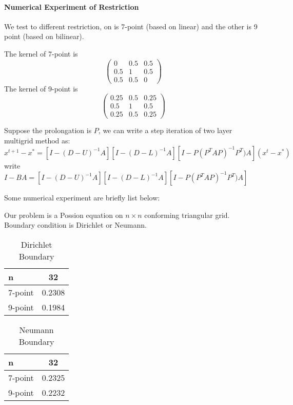 \paragraph{Numerical Experiment of Restriction}
We test to different restriction, on is 7-point (based on linear) and the other is 9 point (based on bilinear).

 The kernel of 7-point is 
\begin{equation}
\begin{pmatrix}
0 &0.5 &0.5\\
0.5 &1 &0.5\\
0.5 &0.5 &0
\end{pmatrix} 
\end{equation} 
 The kernel of 9-point is 
\begin{equation}
\begin{pmatrix}
0.25 &0.5 &0.25\\
0.5 &1 &0.5\\
0.25 &0.5 &0.25
\end{pmatrix} 
\end{equation} 

Suppose the prolongation is $P$, 
we can write a step iteration of two layer multigrid method as:
\begin{equation}
x^{t+1}-x^*=[I-(D-U)^{-1}A][I-(D-L)^{-1}A][I-P(P^T A P)^{-1}P^T)A](x^t-x^*)
\end{equation}
write $I-BA=[I-(D-U)^{-1}A][I-(D-L)^{-1}A][I-P(P^T A P)^{-1}P^T)A]$


Some numerical experiment are briefly list below:

Our problem is a Possion equation on $n\times n$ conforming triangular grid. Boundary condition is Dirichlet or Neumann.

\begin{table}[!htp]
	\caption{Dirichlet Boundary}
	\begin{tabular}{l |c}
		n&  32\\ \hline
		7-point  & 0.2308	\\
		9-point  & 0.1984	\\
	\end{tabular}
\end{table}
\begin{table}[!htp]
	\caption{Neumann Boundary}
	\begin{tabular}{l |c}
		n&  32\\ \hline
		7-point  & 0.2325	\\
		9-point  & 0.2232	\\
	\end{tabular}
\end{table}


